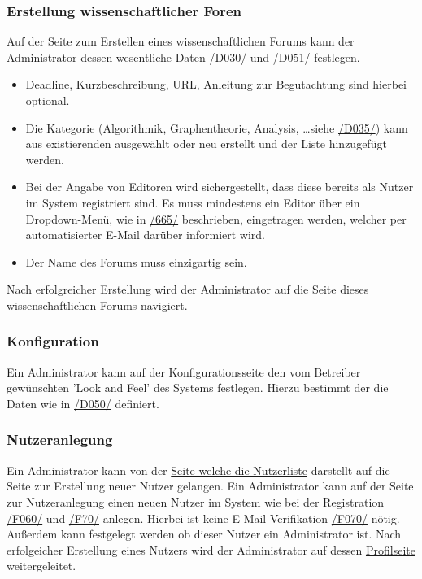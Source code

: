 \subsubsection{Erstellung wissenschaftlicher Foren}
\begin{description}
     Auf der Seite zum Erstellen eines wissenschaftlichen Forums kann der Administrator dessen
    wesentliche Daten \hyperref[d030]{/D030/} und \hyperref[d051]{/D051/}
    festlegen.
    \begin{itemize}
        \item Deadline, Kurzbeschreibung, URL, Anleitung zur Begutachtung sind hierbei optional.
        \item  Die Kategorie (Algorithmik, Graphentheorie, Analysis, \ldots siehe \hyperref[d035]{/D035/}) kann aus existierenden ausgewählt
        oder neu erstellt und der Liste hinzugefügt werden.
        \item Bei der Angabe von Editoren wird sichergestellt, dass diese bereits als Nutzer im System registriert sind.
        Es muss mindestens ein Editor über ein Dropdown-Menü, wie in \hyperref[funkt:665]{/665/} beschrieben, eingetragen werden,
        welcher per automatisierter E-Mail darüber informiert wird.
        \item Der Name des Forums muss einzigartig sein.
    \end{itemize}
    Nach erfolgreicher Erstellung wird der Administrator auf die Seite dieses wissenschaftlichen Forums
    navigiert.
\end{description}

\subsubsection{Konfiguration}
\begin{description}
     Ein Administrator kann auf der Konfigurationsseite den vom Betreiber gewünschten
    'Look and Feel' des Systems festlegen. Hierzu bestimmt der die Daten wie in \hyperref[d050]{/D050/} definiert.
\end{description}

\subsubsection{Nutzeranlegung}
\begin{description}
     Ein Administrator kann von der \hyperref[ed:benutzer]{Seite welche die Nutzerliste} darstellt auf die Seite zur
    Erstellung neuer Nutzer gelangen.
     Ein Administrator kann auf der Seite zur Nutzeranlegung
    einen neuen Nutzer im System wie bei der Registration \hyperref[funkt:060]{/F060/} und \hyperref[funkt:070]{/F70/}
    anlegen. Hierbei ist keine E-Mail-Verifikation \hyperref[funkt:070]{/F070/} nötig. Außerdem kann festgelegt werden ob dieser Nutzer ein Administrator ist.
     Nach erfolgeicher Erstellung eines Nutzers wird der Administrator auf dessen \hyperref[ad:profil]{Profilseite} weitergeleitet.
\end{description}